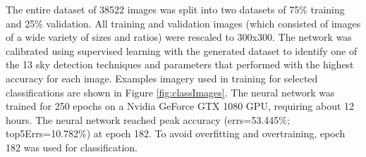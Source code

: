 \documentclass[final,3p,times,authoryear]{elsarticle}
\begin{document}
The entire dataset of 38522 images was split into two datasets of 75\% training and 25\% validation. All training and validation images (which consisted of images of a wide variety of sizes and ratios) were rescaled to 300x300. The network was calibrated using supervised learning with the generated dataset to identify one of the 13 sky detection techniques and parameters that performed with the highest accuracy for each image. Examples imagery used in training for selected classifications are shown in Figure \ref{fig:classImages}. The neural network was trained for 250 epochs on a Nvidia GeForce GTX 1080 GPU, requiring about 12 hours. The neural network reached peak accuracy (errs=53.445\%; top5Errs=10.782\%) at epoch 182. To avoid overfitting and overtraining, epoch 182 was used for classification.

\end{document}
